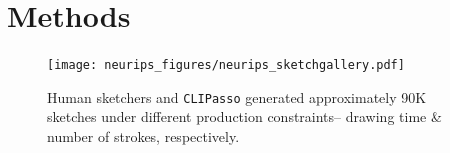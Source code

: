 \documentclass{article}
\begin{document}


\section{Methods}
\begin{figure}
    \centering
    \texttt{[image: neurips\_figures/neurips\_sketchgallery.pdf]}
    \caption{Human sketchers and \texttt{CLIPasso} generated approximately 90K sketches under different production constraints-- drawing time & number of strokes, respectively.}
    \label{fig:examplegallery}
\end{figure}
\end{document}
